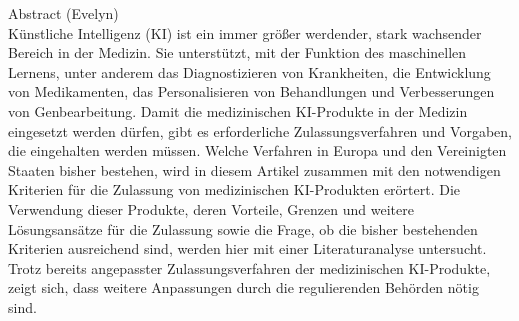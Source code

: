 {\centering
{\large Abstract (Evelyn)\\}
}
Künstliche Intelligenz (KI) ist ein immer größer werdender, stark wachsender Bereich in der Medizin.
Sie unterstützt, mit der Funktion des maschinellen Lernens,
unter anderem das Diagnostizieren von Krankheiten, die Entwicklung von Medikamenten,
das Personalisieren von Behandlungen und Verbesserungen von Genbearbeitung.
Damit die medizinischen KI-Produkte in der Medizin eingesetzt werden dürfen,
gibt es erforderliche Zulassungsverfahren und Vorgaben, die eingehalten werden müssen.
Welche Verfahren in Europa und den Vereinigten Staaten bisher bestehen,
wird in diesem Artikel zusammen mit den notwendigen Kriterien
für die Zulassung von medizinischen KI-Produkten erörtert.
Die Verwendung dieser Produkte, deren Vorteile,
Grenzen und weitere Lösungsansätze für die Zulassung sowie die Frage,
ob die bisher bestehenden Kriterien ausreichend sind,
werden hier mit einer Literaturanalyse untersucht.
Trotz bereits angepasster Zulassungsverfahren der medizinischen KI-Produkte,
zeigt sich,
dass weitere Anpassungen durch die regulierenden Behörden nötig sind.